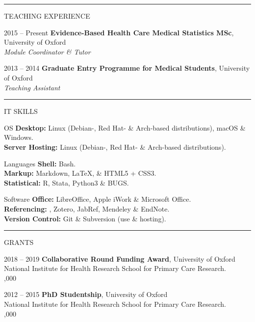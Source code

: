 \documentclass[10pt,a4paper]{article}
\begin{document}
\noindent\rule{\textwidth}{0.4pt}
\begin{cvlist}{TEACHING EXPERIENCE}
  
  \item[2015 -- Present]
  \textbf{Evidence-Based Health Care Medical Statistics MSc}, University of Oxford \\
  \textit{Module Coordinator \& Tutor}
  
  \item[2013 -- 2014]
  \textbf{Graduate Entry Programme for Medical Students}, University of Oxford \\
  \textit{Teaching Assistant}
  
\end{cvlist}


\noindent\rule{\textwidth}{0.4pt}
\begin{cvlist}{IT SKILLS}

  \item[OS]
  \textbf{Desktop:} Linux (Debian-, Red Hat- \& Arch-based distributions), macOS \& Windows. \\
  \textbf{Server Hosting:} Linux (Debian-, Red Hat- \& Arch-based distributions).
  
  \item[Languages]
  \textbf{Shell:} Bash. \\
  \textbf{Markup:} Markdown, \LaTeX , \& HTML5 + CSS3. \\
  \textbf{Statistical:} R, Stata, Python3 \& BUGS.
  
  \item[Software]
  \textbf{Office:} LibreOffice, Apple iWork \& Microsoft Office. \\
  \textbf{Referencing:} , Zotero, JabRef, Mendeley \& EndNote. \\
  \textbf{Version Control:} Git \& Subversion (use \& hosting).
  
\end{cvlist}


\noindent\rule{\textwidth}{0.4pt}
\begin{cvlist}{GRANTS}
  
  \item[2018 -- 2019]
  \textbf{Collaborative Round Funding Award}, University of Oxford \\
  National Institute for Health Research School for Primary Care Research. \\
  ,000
  
  \item[2012 -- 2015]
  \textbf{PhD Studentship}, University of Oxford \\
  National Institute for Health Research School for Primary Care Research. \\
  ,000
  
\end{cvlist}
\end{document}
